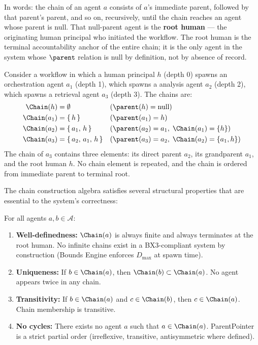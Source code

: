 In words: the chain of an agent $a$ consists of $a$'s immediate parent, followed by that parent's parent, and so on, recursively, until the chain reaches an agent whose parent is null. That null-parent agent is the \textbf{root human} — the originating human principal who initiated the workflow. The root human is the terminal accountability anchor of the entire chain; it is the only agent in the system whose $\parent$ relation is null by definition, not by absence of record.

\begin{example}
Consider a workflow in which a human principal $h$ (depth 0) spawns an orchestration agent $a_1$ (depth 1), which spawns a analysis agent $a_2$ (depth 2), which spawns a retrieval agent $a_3$ (depth 3). The chains are:
\begin{align*}
\Chain(h)   &= \emptyset                                           && (\parent(h) = \text{null})\\
\Chain(a_1) &= \{\,h\,\}                                           && (\parent(a_1) = h)\\
\Chain(a_2) &= \{\,a_1,\, h\,\}                                    && (\parent(a_2) = a_1, \;\Chain(a_1) = \{h\})\\
\Chain(a_3) &= \{\,a_2,\, a_1,\, h\,\}                             && (\parent(a_3) = a_2, \;\Chain(a_2) = \{a_1, h\})
\end{align*}
The chain of $a_3$ contains three elements: its direct parent $a_2$, its grandparent $a_1$, and the root human $h$. No chain element is repeated, and the chain is ordered from immediate parent to terminal root.
\end{example}

The chain construction algebra satisfies several structural properties that are essential to the system's correctness:

\begin{property}
\label{prop:chain_properties}
For all agents $a, b \in \mathcal{A}$:
\begin{enumerate}
\item \textbf{Well-definedness:} $\Chain(a)$ is always finite and always terminates at the root human. No infinite chains exist in a BX3-compliant system by construction (Bounds Engine enforces $D_{\max}$ at spawn time).
\item \textbf{Uniqueness:} If $b \in \Chain(a)$, then $\Chain(b) \subset \Chain(a)$. No agent appears twice in any chain.
\item \textbf{Transitivity:} If $b \in \Chain(a)$ and $c \in \Chain(b)$, then $c \in \Chain(a)$. Chain membership is transitive.
\item \textbf{No cycles:} There exists no agent $a$ such that $a \in \Chain(a)$. ParentPointer is a strict partial order (irreflexive, transitive, antisymmetric where defined).
\end{enumerate}
\end{property}

